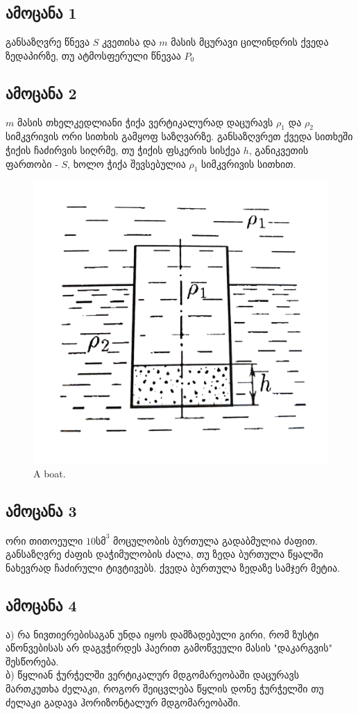 \documentclass{article}
\begin{document}
\subsection{ამოცანა 1}
განსაზღვრე წნევა $S$ კვეთისა და $m$ მასის მცურავი ცილინდრის ქვედა ზედაპირზე, თუ ატმოსფერული წნევაა $P_0$
		
\subsection{ამოცანა 2}
$m$ მასის თხელკედლიანი ჭიქა ვერტიკალურად დაცურავს $\rho_1$ და $\rho_2$ სიმკვრივის ორი სითხის გამყოფ საზღვარზე. განსაზღვრეთ ქვედა სითხეში ჭიქის ჩაძირვის სიღრმე, თუ ჭიქის ფსკერის სისქეა $h$, განიკვეთის ფართობი - $S$, ხოლო ჭიქა შევსებულია $\rho_1$ სიმკვრივის სითხით.
\begin{figure}[h]
  \includegraphics[width = .5\textwidth]{figures/figure_02}
  \caption{A boat.}
  \label{fig:boat1}
\end{figure}

\subsection{ამოცანა 3}
ორი თითოეული $10 სმ^{3}$ მოცულობის ბურთულა გადაბმულია ძაფით. განსაზღვრე ძაფის დაჭიმულობის ძალა, თუ ზედა ბურთულა წყალში ნახევრად ჩაძირული ტივტივებს. ქვედა ბურთულა ზედაზე სამჯერ მეტია. 

\subsection{ამოცანა 4}
ა) რა ნივთიერებისაგან უნდა იყოს დამზადებული გირი, რომ ზუსტი აწონვებისას არ დაგვჭირდეს ჰაერით გამოწვეული მასის "დაკარგვის" შესწორება. \\
ბ) წყლიან ჭურჭელში ვერტიკალურ მდგომარეობაში დაცურავს მართკუთხა ძელაკი, როგორ შეიცვლება წყლის დონე ჭურჭელში თუ ძელაკი გადავა ჰორიზონტალურ მდგომარეობაში.
\end{document}
